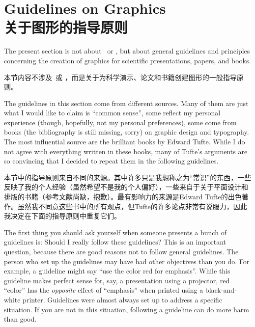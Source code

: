 %
%
%
\setcounter{section}{6}
\setcounter{subsection}{7}
\setcounter{subsubsection}{0}

\section{Guidelines on Graphics\\关于图形的指导原则}

The present section is not about \pgfname\ or \tikzname, but about general
guidelines and principles concerning the creation of graphics for scientific
presentations, papers, and books.

本节内容不涉及\pgfname\ 或 \tikzname，而是关于为科学演示、论文和书籍创建图形的一般指导原则。

The guidelines in this section come from different sources. Many of them are
just what I would like to claim is ``common sense'', some reflect my personal
experience (though, hopefully, not my personal preferences), some come from
books (the bibliography is still missing, sorry) on graphic design and
typography. The most influential source  are the brilliant books by Edward
Tufte. While I do not agree with everything written in these books, many of
Tufte's arguments are so convincing that I decided to repeat them in the
following guidelines.

本节中的指导原则来自不同的来源。其中许多只是我想称之为“常识”的东西，一些反映了我的个人经验（虽然希望不是我的个人偏好），一些来自于关于平面设计和排版的书籍（参考文献尚缺，抱歉）。最有影响力的来源是Edward Tufte的出色著作。虽然我不同意这些书中的所有观点，但Tufte的许多论点非常有说服力，因此我决定在下面的指导原则中重复它们。

The first thing you should ask yourself when someone presents a bunch of
guidelines is: Should I really follow these guidelines? This is an important
question, because there are good reasons not to follow general guidelines. The
person who set up the guidelines may have had other objectives than you do. For
example, a guideline might say ``use the color red for emphasis''. While this
guideline makes perfect sense for, say, a presentation using a projector, red
``color'' has the \emph{opposite} effect of ``emphasis'' when printed using a
black-and-white printer. Guidelines were almost always set up to address a
specific situation. If you are not in this situation, following a guideline can
do more harm than good.

